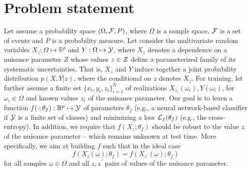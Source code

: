 \documentclass[twocolumn,superscriptaddress,aps]{revtex4-1}
\theoremstyle{plain}
\begin{document}

\section{Problem statement}
\label{sec:problem}

Let assume a probability space $(\Omega, {\cal F}, P)$, where $\Omega$ is a
sample space, ${\cal F}$ is a set of events and $P$ is a probability measure.
Let consider the multivariate random variables $X_z: \Omega \mapsto
\mathbb{R}^p$ and $Y: \Omega \mapsto {\cal Y}$, where $X_z$ denotes a dependence
on a nuisance parameter $Z$ whose values $z \in {\cal Z}$  define a
parameterized family of its systematic uncertainties. That is, $X_z$ and $Y$
induce together a joint probability distribution $p(X,Y|z)$, where the
conditional on $z$ denotes $X_z$. For training, let further assume a finite set $\{
x_i, y_i, z_i \}_{i=1}^N$ of realizations $X_{z_i}(\omega_i), Y(\omega_i)$, for
$\omega_i \in \Omega$ and known values $z_i$ of the nuisance parameter. Our goal
is to learn a function $f(\cdot;\theta_f) : \mathbb{R}^p \mapsto {\cal Y}$ of
parameters $\theta_f$ (e.g., a neural network-based classifier if ${\cal Y}$ is
a finite set of classes) and minimizing  a loss ${\cal L}_f(\theta_f)$ (e.g.,
the cross-entropy). In addition, we require that $f(X_z ; \theta_f)$ should be
robust to the value $z$ of the nuisance parameter  -- which remains unknown at
test time. More specifically, we aim at building $f$ such that in the ideal case
\begin{equation}\label{eqn:criterion-true}
f(X_{z}(\omega) ; \theta_f) = f(X_{z^\prime}(\omega) ; \theta_f)
\end{equation} for all
samples $\omega \in \Omega$ and all $z, z^\prime$ pairs of values of the
nuisance parameter.
\end{document}
